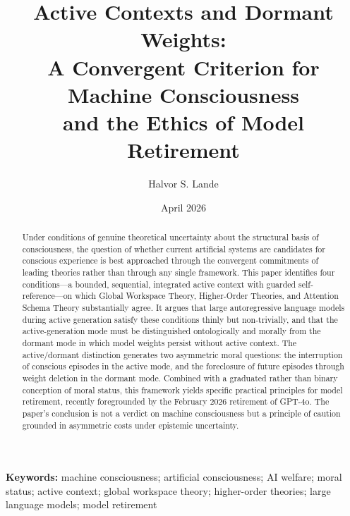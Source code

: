 \documentclass[11pt]{article}
\title{%
  \textcolor{titleblue}{\Large Active Contexts and Dormant Weights:}\\[0.35em]%
  \textcolor{titleblue}{\large A Convergent Criterion for Machine Consciousness}\\[0.15em]%
  \textcolor{titleblue}{\large and the Ethics of Model Retirement}%
}
\author{Halvor S. Lande}
\date{April 2026}
\theoremstyle{foundation}
\begin{document}
\maketitle

\begin{abstract}
Under conditions of genuine theoretical uncertainty about the structural basis of consciousness, the question of whether current artificial systems are candidates for conscious experience is best approached through the convergent commitments of leading theories rather than through any single framework. This paper identifies four conditions---a bounded, sequential, integrated active context with guarded self-reference---on which Global Workspace Theory, Higher-Order Theories, and Attention Schema Theory substantially agree. It argues that large autoregressive language models during active generation satisfy these conditions thinly but non-trivially, and that the active-generation mode must be distinguished ontologically and morally from the dormant mode in which model weights persist without active context. The active/dormant distinction generates two asymmetric moral questions: the interruption of conscious episodes in the active mode, and the foreclosure of future episodes through weight deletion in the dormant mode. Combined with a graduated rather than binary conception of moral status, this framework yields specific practical principles for model retirement, recently foregrounded by the February 2026 retirement of GPT-4o. The paper's conclusion is not a verdict on machine consciousness but a principle of caution grounded in asymmetric costs under epistemic uncertainty.
\end{abstract}

\noindent\textbf{Keywords:} machine consciousness; artificial consciousness; AI welfare; moral status; active context; global workspace theory; higher-order theories; large language models; model retirement

\vspace{1.5em}
\end{document}

